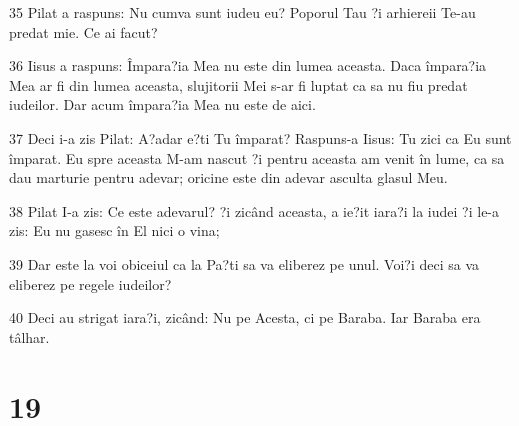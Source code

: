 \par 35 Pilat a raspuns: Nu cumva sunt iudeu eu? Poporul Tau ?i arhiereii Te-au predat mie. Ce ai facut?
\par 36 Iisus a raspuns: Împara?ia Mea nu este din lumea aceasta. Daca împara?ia Mea ar fi din lumea aceasta, slujitorii Mei s-ar fi luptat ca sa nu fiu predat iudeilor. Dar acum împara?ia Mea nu este de aici.
\par 37 Deci i-a zis Pilat: A?adar e?ti Tu împarat? Raspuns-a Iisus: Tu zici ca Eu sunt împarat. Eu spre aceasta M-am nascut ?i pentru aceasta am venit în lume, ca sa dau marturie pentru adevar; oricine este din adevar asculta glasul Meu.
\par 38 Pilat I-a zis: Ce este adevarul? ?i zicând aceasta, a ie?it iara?i la iudei ?i le-a zis: Eu nu gasesc în El nici o vina;
\par 39 Dar este la voi obiceiul ca la Pa?ti sa va eliberez pe unul. Voi?i deci sa va eliberez pe regele iudeilor?
\par 40 Deci au strigat iara?i, zicând: Nu pe Acesta, ci pe Baraba. Iar Baraba era tâlhar.

\chapter{19}

